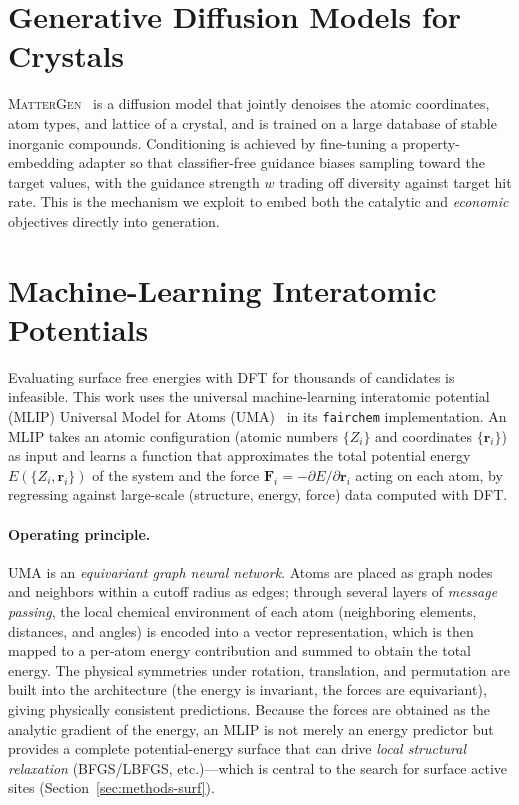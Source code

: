 \documentclass[11pt,a4paper]{report}
\begin{document}
\section{Generative Diffusion Models for Crystals}
\textsc{MatterGen}~\cite{zeni2025} is a diffusion model that jointly denoises the atomic coordinates, atom types, and lattice of a crystal, and is
trained on a large database of stable inorganic compounds. Conditioning is achieved by fine-tuning a property-embedding adapter so that classifier-free guidance
biases sampling toward the target values, with the guidance strength $w$ trading off diversity against target hit rate. This is the mechanism we exploit to embed both the catalytic and \emph{economic}
objectives directly into generation.

\section{Machine-Learning Interatomic Potentials}
\label{sec:mlip-theory}
Evaluating surface free energies with DFT for thousands of candidates is infeasible. This work uses the universal machine-learning
interatomic potential (MLIP) Universal Model for Atoms (UMA)~\cite{uma2025} in its \texttt{fairchem} implementation.
An MLIP takes an atomic configuration (atomic numbers $\{Z_i\}$ and coordinates $\{\mathbf{r}_i\}$) as input and learns a function that approximates the total
potential energy $E(\{Z_i,\mathbf{r}_i\})$ of the system and the force $\mathbf{F}_i=-\partial E/\partial
\mathbf{r}_i$ acting on each atom, by regressing against large-scale (structure, energy, force) data computed with DFT.

\paragraph{Operating principle.} UMA is an \emph{equivariant graph neural network}. Atoms are placed as
graph nodes and neighbors within a cutoff radius as edges; through several layers of \emph{message passing},
the local chemical environment of each atom (neighboring elements, distances, and angles) is encoded into a vector representation, which is then mapped to a per-atom energy
contribution and summed to obtain the total energy. The physical symmetries under rotation, translation, and permutation are built into the architecture
(the energy is invariant, the forces are equivariant), giving physically consistent predictions. Because the forces are
obtained as the analytic gradient of the energy, an MLIP is not merely an energy predictor but provides a complete potential-energy surface that can drive \emph{local structural relaxation}
(BFGS/LBFGS, etc.)---which is central to the search for surface active sites
(Section~\ref{sec:methods-surf}).
\end{document}
